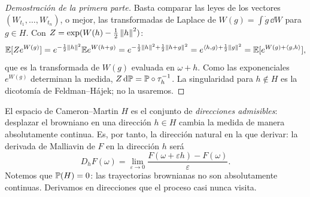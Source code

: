 \begin{proof}[Demostración de la primera parte]
Basta comparar las leyes de los vectores $(W_{t_1},\dots,W_{t_n})$, o
mejor, las transformadas de Laplace de $W(g)=\int\dot g\,\dd W$ para $g\in H$. Con $Z=\exp(W(h)-
\frac12\norm{h}^2)$:
\[
  \E[Ze^{W(g)}]=e^{-\frac12\norm{h}^2}\E e^{W(h+g)}=e^{-\frac12\norm{h}^2+\frac12\norm{h+g}^2}=e^{\ip{h}{g}+\frac12\norm{g}^2}=\E[e^{W(g)+\ip{g}{h}}],
\]
que es la transformada de $W(g)$ evaluada en $\omega+h$. Como las exponenciales $e^{W(g)}$ determinan
la medida, $Z\,\dd\P=\P\circ\tau_h^{-1}$. La singularidad para $h\notin H$ es la dicotomía de Feldman--Hájek; no
la usaremos.
\end{proof}

\begin{intuicion}
El espacio de Cameron--Martin $H$ es el conjunto de \emph{direcciones admisibles}: desplazar el
browniano en una dirección $h\in H$ cambia la medida de manera absolutamente continua.
Es, por tanto, la dirección natural en la que derivar: la derivada de Malliavin de $F$ en la
dirección $h$ será
\[
  D_hF(\omega)=\lim_{\varepsilon\to0}\frac{F(\omega+\varepsilon h)-F(\omega)}{\varepsilon}.
\]
Notemos que $\P(H)=0$: las trayectorias brownianas no son absolutamente continuas.
Derivamos en direcciones que el proceso casi nunca visita.
\end{intuicion}
